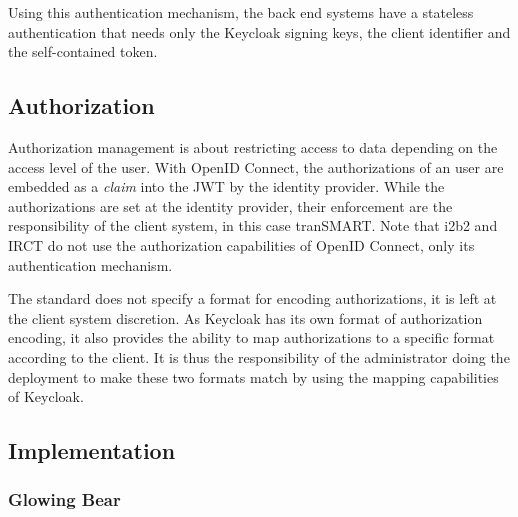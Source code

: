 Using this authentication mechanism, the back end systems have a stateless authentication that needs only the Keycloak signing keys, the client identifier and the self-contained token.



\subsection{Authorization}

Authorization management is about restricting access to data depending on the access level of the user.
With OpenID Connect, the authorizations of an user are embedded as a \emph{claim} into the JWT by the identity provider.
While the authorizations are set at the identity provider, their enforcement are the responsibility of the client system, in this case tranSMART. 
Note that i2b2 and IRCT do not use the authorization capabilities of OpenID Connect, only its authentication mechanism.

The standard does not specify a format for encoding authorizations, it is left at the client system discretion.
As Keycloak has its own format of authorization encoding, it also provides the ability to map authorizations to a specific format according to the client.
It is thus the responsibility of the administrator doing the deployment to make these two formats match by using the mapping capabilities of Keycloak.


\subsection{Implementation}


\subsubsection{Glowing Bear}

